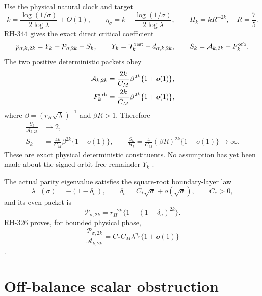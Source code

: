 \documentclass[11pt]{article}
\theoremstyle{remark}
\newcommand{\cP}{\mathcal P}
\newcommand{\cA}{\mathcal A}
\begin{document}
Use the physical natural clock and target
\begin{equation}\label{eq:clock}
 k=\frac{\log(1/\sigma)}{2\log\lambda}+O(1),\qquad
 \eta_\sigma=k-\frac{\log(1/\sigma)}{2\log\lambda},\qquad
 H_k=kR^{-2k},\quad R=\frac75.
\end{equation}
RH-344 gives the exact direct critical coefficient
\begin{equation}\label{eq:critical}
 p_{\sigma,k,2k}=Y_k+\cP_{\sigma,2k}-S_k,
 \qquad
 Y_k=\mathcal T_k^{\rm rest}-d_{\sigma,k,2k},
 \qquad
 S_k=\cA_{k,2k}+F_k^{\rm orb}.
\end{equation}
The two positive deterministic packets obey
\begin{align}
 \cA_{k,2k}
 &=\frac{2k}{C_M}\beta^{2k}\{1+o(1)\},
 \label{eq:A-scale}\\
 F_k^{\rm orb}
 &=\frac{2k}{C_M}\beta^{2k}\{1+o(1)\},
 \label{eq:F-scale}
\end{align}
where $\beta=(r_H\sqrt\lambda)^{-1}$ and $\beta R>1$.  Therefore
\begin{align}
 \frac{S_k}{\cA_{k,2k}}&\longrightarrow2,
 \label{eq:S-over-A}\\
 S_k&=\frac{4k}{C_M}\beta^{2k}\{1+o(1)\},
 \qquad
 \frac{S_k}{H_k}=\frac4{C_M}(\beta R)^{2k}\{1+o(1)\}
 \longrightarrow\infty.
 \label{eq:S-scale}
\end{align}
These are exact physical deterministic constituents.  No assumption has yet
been made about the signed orbit-free remainder $Y_k$
\citep{WangCompleteOrbit2026}.

The actual parity eigenvalue satisfies the square-root boundary-layer law
\begin{equation}\label{eq:delta}
 \lambda_-(\sigma)=-(1-\delta_\sigma),\qquad
 \delta_\sigma=C_*\sqrt\sigma+o(\sqrt\sigma),\qquad C_*>0,
\end{equation}
and its even packet is
\begin{equation}\label{eq:P}
 \cP_{\sigma,2k}=r_H^{-2k}\{1-(1-\delta_\sigma)^{2k}\}.
\end{equation}
RH-326 proves, for bounded physical phase,
\begin{equation}\label{eq:phase-law}
 \frac{\cP_{\sigma,2k}}{\cA_{k,2k}}
 =C_*C_M\lambda^{\eta_\sigma}\{1+o(1)\}
\end{equation}
\citep{WangParityBoundary2026,WangFirstAlias2026}.

\section{Off-balance scalar obstruction}
\end{document}

